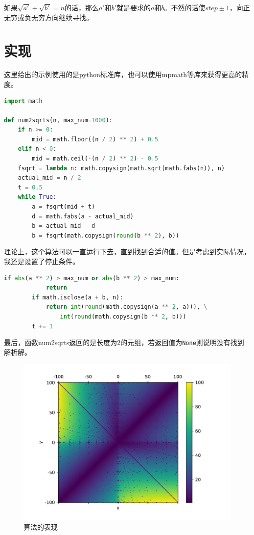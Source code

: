 \documentclass[a4paper, UTF8]{ctexart}
\begin{document}
如果$\sqrt{a'}+\sqrt{b'}=n$的话，那么$a'$和$b'$就是要求的$a$和$b$。不然的话使$step\pm1$，向正无穷或负无穷方向继续寻找。

\section{实现}
这里给出的示例使用的是python标准库，也可以使用mpmath等库来获得更高的精度。
\begin{lstlisting}[language=python, name=example]
import math

def num2sqrts(n, max_num=1000):
	if n >= 0:
        mid = math.floor((n / 2) ** 2) + 0.5
    elif n < 0:
        mid = math.ceil(-(n / 2) ** 2) - 0.5
    fsqrt = lambda n: math.copysign(math.sqrt(math.fabs(n)), n)
    actual_mid = n / 2
    t = 0.5
    while True:
        a = fsqrt(mid + t)
        d = math.fabs(a - actual_mid)
        b = actual_mid - d
        b = fsqrt(math.copysign(round(b ** 2), b))
\end{lstlisting}
理论上，这个算法可以一直运行下去，直到找到合适的值。但是考虑到实际情况，我还是设置了停止条件。
\begin{lstlisting}[language=python, name=example]
        if abs(a ** 2) > max_num or abs(b ** 2) > max_num:
            return
        if math.isclose(a + b, n):
            return int(round(math.copysign(a ** 2, a))), \
                int(round(math.copysign(b ** 2, b)))
        t += 1
\end{lstlisting}
最后，函数num2sqrts返回的是长度为2的元组，若返回值为\verb|None|则说明没有找到解析解。

\begin{figure}[htb]
	\centering
	\includegraphics[width=0.8\linewidth]{perform.pdf}
	\caption{算法的表现}
	\label{fig:perform}
\end{figure}
\end{document}
